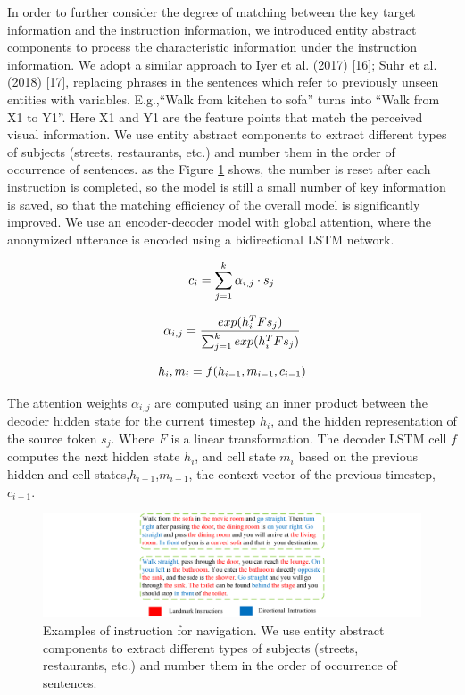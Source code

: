 In order to further consider the degree of matching between the key target information and the instruction information, we introduced entity abstract components to process the characteristic information under the instruction information. We adopt a similar approach to Iyer et al. (2017) [16]; Suhr et al. (2018) [17], replacing phrases in the sentences which refer to previously unseen entities with variables. E.g.,“Walk from kitchen to sofa” turns into “Walk from X1 to Y1”. Here X1 and Y1 are the feature points that match the perceived visual information. We use entity abstract components to extract different types of subjects (streets, restaurants, etc.) and number them in the order of occurrence of sentences. as the Figure \ref{image05} shows, the number is reset after each instruction is completed, so the model is still a small number of key information is saved, so that the matching efficiency of the overall model is significantly improved. 
We use an encoder-decoder model with global attention, where the anonymized utterance is encoded using a bidirectional LSTM network. 

\begin{equation}
	\centering
	{c}_{i} = \displaystyle\sum_{j=1}^k {\alpha}_{i, j} \cdot s_{j}
\end{equation}

\begin{equation}
	\centering
	{\alpha}_{i, j} = {\frac{exp({h_{i}^{T}Fs_{j}})}{\sum_{j=1}^{k}exp({h_{i}^{T}Fs_{j}})}}
\end{equation}

\begin{equation}
	\centering
	{h}_{i}, {m}_{i} = f({h}_{i-1}, {m}_{i-1}, {c}_{i-1})
\end{equation}

The attention weights ${\alpha}_{i, j}$ are computed using an inner product between the decoder hidden state for the current timestep ${h}_{i}$, and the hidden representation of the source token ${s}_{j}$. Where ${F}$ is a linear transformation. The decoder LSTM cell ${f}$ computes the next hidden state ${h}_{i}$, and cell state ${m}_{i}$ based on the previous hidden and cell states,${h}_{i-1}$,${m}_{i-1}$, the context vector of the previous timestep, ${c}_{i-1}$.

\begin{figure}
	\centering
	\includegraphics[scale=1]{image05.png}
	\caption{Examples of instruction for navigation. We use entity abstract components to extract different types of subjects (streets, restaurants, etc.) and number them in the order of occurrence of sentences.}
	\label{image05}
\end{figure}

